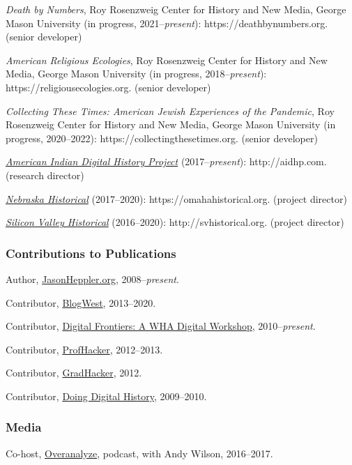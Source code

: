 \emph{Death by Numbers}, Roy Rosenzweig Center for History and New
Media, George Mason University (in progress, 2021--\emph{present}):
https://deathbynumbers.org. (senior developer)

\emph{American Religious Ecologies}, Roy Rosenzweig Center for History
and New Media, George Mason University (in progress,
2018--\emph{present}): https://religiousecologies.org. (senior
developer)

\emph{Collecting These Times: American Jewish Experiences of the
Pandemic}, Roy Rosenzweig Center for History and New Media, George Mason
University (in progress, 2020--2022): https://collectingthesetimes.org.
(senior developer)

\emph{\href{http://aidhp.com}{American Indian Digital History Project}}
(2017--\emph{present}): http://aidhp.com. (research director)

\emph{\href{https://omahahistorical.org}{Nebraska Historical}}
(2017--2020): https://omahahistorical.org. (project director)

\emph{\href{http://svhistorical.org}{Silicon Valley Historical}}
(2016--2020): http://svhistorical.org. (project director)

\hypertarget{contributions-to-publications}{%
\subsubsection{Contributions to
Publications}\label{contributions-to-publications}}

Author, \href{http://jasonheppler.org}{JasonHeppler.org},
2008--\emph{present}.

Contributor, \href{http://blogwest.org/}{BlogWest}, 2013--2020.

Contributor, \href{http://whadigitalfrontiers.com/}{Digital Frontiers: A
WHA Digital Workshop}, 2010--\emph{present}.

Contributor, \href{http://chronicle.com/blogs/profhacker/}{ProfHacker},
2012--2013.

Contributor,
\href{https://www.insidehighered.com/blogs/gradhacker}{GradHacker},
2012.

Contributor, \href{http://digitalhistory.unl.edu/}{Doing Digital
History}, 2009--2010.

\hypertarget{media}{%
\subsubsection{Media}\label{media}}

Co-host, \href{http://overanalyze.fireside.fm}{Overanalyze}, podcast,
with Andy Wilson, 2016--2017.

